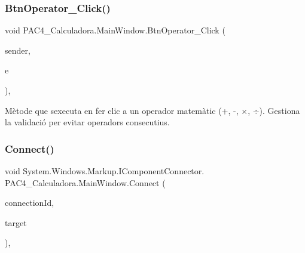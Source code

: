 \subsubsection{\texorpdfstring{Btn\+Operator\+\_\+\+Click()}{BtnOperator\_Click()}\hspace{0.1cm}{\footnotesize\ttfamily [2/2]}}
{\footnotesize\ttfamily void P\+A\+C4\+\_\+\+Calculadora.\+Main\+Window.\+Btn\+Operator\+\_\+\+Click (\begin{DoxyParamCaption}\item[{object}]{sender,  }\item[{Routed\+Event\+Args}]{e }\end{DoxyParamCaption})\hspace{0.3cm}{\ttfamily [inline]}, {\ttfamily [private]}}



Mètode que s\textquotesingle{}executa en fer clic a un operador matemàtic (+, -\/, ×, ÷). Gestiona la validació per evitar operadors consecutius. 

\mbox{\label{class_p_a_c4___calculadora_1_1_main_window_afce5a132393509f37c5ad1a7654e9a8c}} 
\subsubsection{\texorpdfstring{Connect()}{Connect()}\hspace{0.1cm}{\footnotesize\ttfamily [1/2]}}
{\footnotesize\ttfamily void System.\+Windows.\+Markup.\+I\+Component\+Connector. P\+A\+C4\+\_\+\+Calculadora.\+Main\+Window.\+Connect (\begin{DoxyParamCaption}\item[{int}]{connection\+Id,  }\item[{object}]{target }\end{DoxyParamCaption})\hspace{0.3cm}{\ttfamily [inline]}, {\ttfamily [private]}}

\mbox{\label{class_p_a_c4___calculadora_1_1_main_window_afce5a132393509f37c5ad1a7654e9a8c}} 

